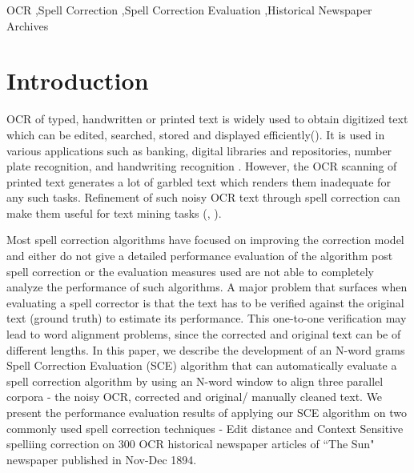 \documentclass[preprint,11pt]{elsarticle}
\begin{document}
\begin{frontmatter}
\begin{abstract}
\end{abstract}

\begin{keyword}
 OCR \sep Spell Correction \sep Spell Correction Evaluation \sep Historical Newspaper Archives


\end{keyword}

\end{frontmatter}




\section{Introduction}

OCR of typed, handwritten or printed text is widely used to obtain digitized text which can be edited, searched, stored and displayed efficiently(\cite{torget2011mapping,palfray2012logical}). It is used in various applications such as banking, digital libraries \cite{mcmurdo2013vermont} and repositories, number plate recognition, and handwriting recognition \cite{singh2012survey}. However, the OCR scanning of printed text generates a lot of garbled text which renders them inadequate for any such tasks. Refinement of such noisy OCR text through spell correction can make them useful for text mining tasks (\cite{dutta2011learning}, \cite{yang2011topic}).

Most spell correction algorithms have focused on improving the correction model and either do not give a detailed performance evaluation of the algorithm post spell correction or the evaluation measures used are not able to completely analyze the performance of such algorithms.  
A major problem that surfaces when evaluating a spell corrector is that the text has to be verified against the original text (ground truth) to estimate its performance. This one-to-one verification may lead to word alignment problems, since the corrected and original text can be of different lengths.
In this paper, we describe the development of an N-word grams Spell Correction Evaluation (SCE) algorithm that can automatically evaluate a spell correction algorithm by using an N-word window to align three parallel corpora - the noisy OCR, corrected and original/ manually cleaned text. 
We present the performance evaluation results of applying our SCE algorithm on two  commonly used spell correction techniques - Edit distance and Context Sensitive spelliing correction on 300 OCR historical newspaper articles of ``The Sun" newspaper published in Nov-Dec 1894. 
\end{document}
